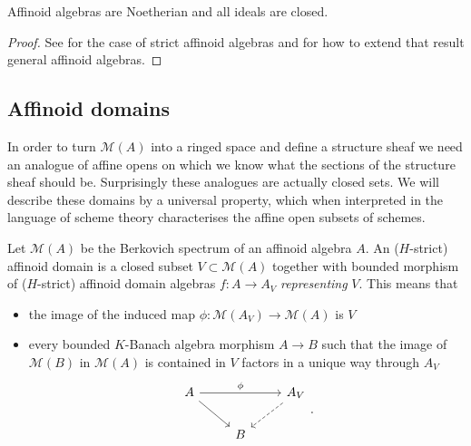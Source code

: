 \begin{proposition}
	Affinoid algebras are Noetherian and all ideals are closed. 
\end{proposition}
\begin{proof}
	See \cite[][chap.\ 6 prop.\ 3]{siegfriedboschNonArchimedeanAnalysisSystematic1984} for the case of strict affinoid algebras and \cite[][prop.\ 2.1.3]{berkovichSpectralTheoryAnalytic2012} for how to extend that result general affinoid algebras. 
\end{proof}

\subsection{Affinoid domains} \label{sec:affinoid_domains}

In order to turn $\mathcal{M} (A)$ into a ringed space and define a structure sheaf we need an analogue of affine opens on which we know what the sections of the structure sheaf should be. 
Surprisingly these analogues are actually closed sets.  
We will describe these domains by a universal property, which when interpreted in the language of scheme theory characterises the affine open subsets of schemes. 

\begin{definition}
	Let $\mathcal{M} (A)$ be the Berkovich spectrum of an affinoid algebra $A$. 
	An ($H$-strict) affinoid domain is a closed subset $V \subset  \mathcal{M} (A)$ together with bounded morphism of ($H$-strict) affinoid domain algebras $f:A \to A_V$ \emph{representing} $V$.
	This means that 
	\begin{itemize}
		\item the image of the induced map $\phi:\mathcal{M} (A_V) \to \mathcal{M} (A)$ is $V$ 
		\item every bounded $K$-Banach algebra morphism $A \to B$ such that the image of $\mathcal{M} (B)$ in $\mathcal{M} (A)$ is contained in $V$ factors in a unique way through $A_V$ \[
	\begin{tikzcd}
		A \ar{rr}{\phi} \ar{dr}& & A_V \ar[dashed]{dl} \\
				& B
	\end{tikzcd}
	.\] 
	\end{itemize}
\end{definition}

